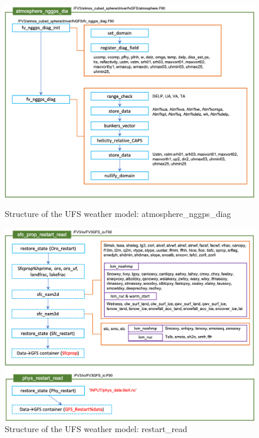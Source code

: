 \documentclass[11pt,fleqn]{report}              %
\begin{document}
\begin{figure}[ht!]
  \centering
  \includegraphics[width=0.73\linewidth]{fv3_struct_atmosphere_nggps_diag.png}
  \caption{Structure of the UFS weather model: atmosphere\_nggps\_diag}
  \label{fig:fv_struct_atmosphere_nggps_diag}

\vspace{0.1cm}

  \includegraphics[width=0.73\linewidth]{fv3_struct_restart_read.png}
  \caption{Structure of the UFS weather model: restart\_read}
  \label{fig:fv_struct_restart_read}
\end{figure}
\end{document}
